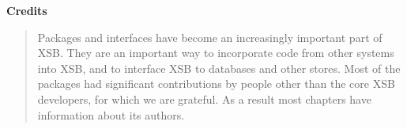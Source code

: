 
\begin{center}
{\bf {\Large 
		Credits
}}
\end{center}


\begin{quote}
  Packages and interfaces have become an increasingly important part
  of XSB.  They are an important way to incorporate code from other
  systems into XSB, and to interface XSB to databases and other
  stores.  Most of the packages had significant contributions by
  people other than the core XSB developers, for which we are
  grateful.  As a result most chapters have information about its
  authors.

  
\end{quote}

